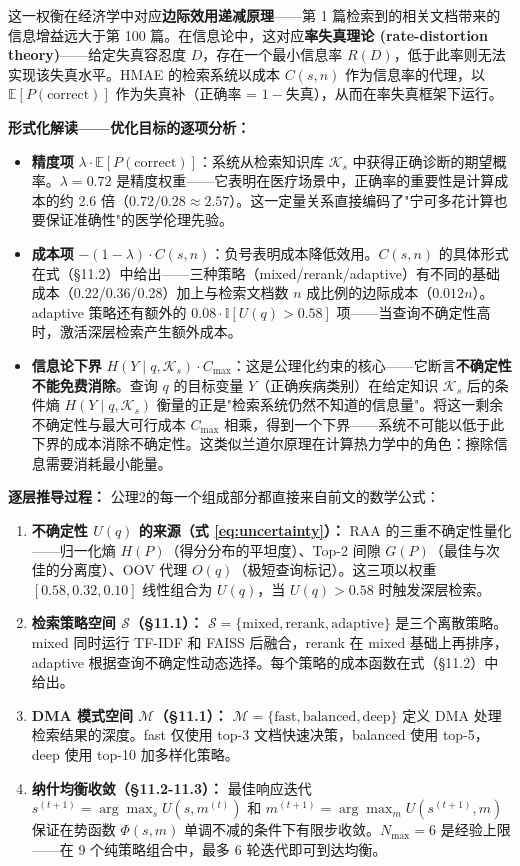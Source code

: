 \documentclass[11pt,a4paper]{ctexart}
\theoremstyle{remark}
\begin{document}
这一权衡在经济学中对应\textbf{边际效用递减原理}——第 1 篇检索到的相关文档带来的信息增益远大于第 100 篇。在信息论中，这对应\textbf{率失真理论 (rate-distortion theory)}——给定失真容忍度 $D$，存在一个最小信息率 $R(D)$，低于此率则无法实现该失真水平。HMAE 的检索系统以成本 $C(s,n)$ 作为信息率的代理，以 $\mathbb{E}[P(\text{correct})]$ 作为失真补（正确率 = $1 - \text{失真}$），从而在率失真框架下运行。

\textbf{形式化解读——优化目标的逐项分析：}
\begin{itemize}[nosep]
\item \textbf{精度项} $\lambda \cdot \mathbb{E}[P(\text{correct})]$：系统从检索知识库 $\mathcal{K}_s$ 中获得正确诊断的期望概率。$\lambda=0.72$ 是精度权重——它表明在医疗场景中，正确率的重要性是计算成本的约 2.6 倍（$0.72/0.28 \approx 2.57$）。这一定量关系直接编码了"宁可多花计算也要保证准确性"的医学伦理先验。
\item \textbf{成本项} $-(1-\lambda) \cdot C(s, n)$：负号表明成本降低效用。$C(s,n)$ 的具体形式在式（§11.2）中给出——三种策略（mixed/rerank/adaptive）有不同的基础成本（0.22/0.36/0.28）加上与检索文档数 $n$ 成比例的边际成本（$0.012n$）。adaptive 策略还有额外的 $0.08 \cdot \mathbb{I}[U(q)>0.58]$ 项——当查询不确定性高时，激活深层检索产生额外成本。
\item \textbf{信息论下界} $H(Y \mid q, \mathcal{K}_s) \cdot C_{\max}$：这是公理化约束的核心——它断言\textbf{不确定性不能免费消除}。查询 $q$ 的目标变量 $Y$（正确疾病类别）在给定知识 $\mathcal{K}_s$ 后的条件熵 $H(Y \mid q, \mathcal{K}_s)$ 衡量的正是"检索系统仍然不知道的信息量"。将这一剩余不确定性与最大可行成本 $C_{\max}$ 相乘，得到一个下界——系统不可能以低于此下界的成本消除不确定性。这类似兰道尔原理在计算热力学中的角色：擦除信息需要消耗最小能量。
\end{itemize}

\textbf{逐层推导过程：} 公理2的每一个组成部分都直接来自前文的数学公式：
\begin{enumerate}[nosep]
\item \textbf{不确定性 $U(q)$ 的来源（式 \ref{eq:uncertainty}）：} RAA 的三重不确定性量化——归一化熵 $H(P)$（得分分布的平坦度）、Top-2 间隙 $G(P)$（最佳与次佳的分离度）、OOV 代理 $O(q)$（极短查询标记）。这三项以权重 $[0.58, 0.32, 0.10]$ 线性组合为 $U(q)$，当 $U(q) > 0.58$ 时触发深层检索。
\item \textbf{检索策略空间 $\mathcal{S}$（§11.1）：} $\mathcal{S} = \{\text{mixed}, \text{rerank}, \text{adaptive}\}$ 是三个离散策略。mixed 同时运行 TF-IDF 和 FAISS 后融合，rerank 在 mixed 基础上再排序，adaptive 根据查询不确定性动态选择。每个策略的成本函数在式（§11.2）中给出。
\item \textbf{DMA 模式空间 $\mathcal{M}$（§11.1）：} $\mathcal{M} = \{\text{fast}, \text{balanced}, \text{deep}\}$ 定义 DMA 处理检索结果的深度。fast 仅使用 top-3 文档快速决策，balanced 使用 top-5，deep 使用 top-10 加多样化策略。
\item \textbf{纳什均衡收敛（§11.2-11.3）：} 最佳响应迭代 $s^{(t+1)} = \arg\max_s U(s, m^{(t)})$ 和 $m^{(t+1)} = \arg\max_m U(s^{(t+1)}, m)$ 保证在势函数 $\Phi(s,m)$ 单调不减的条件下有限步收敛。$N_{\max}=6$ 是经验上限——在 9 个纯策略组合中，最多 6 轮迭代即可到达均衡。
\end{enumerate}
\end{document}
